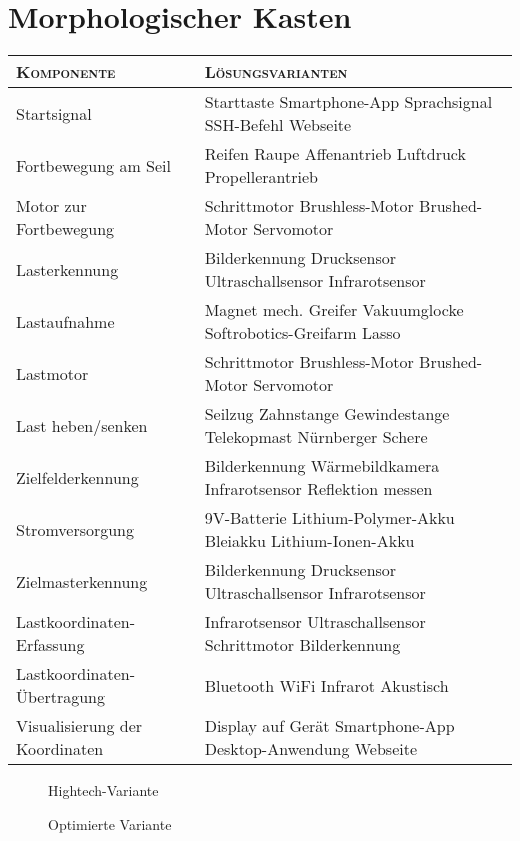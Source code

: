 \documentclass[a4paper,12pt,landscape]{scrartcl}
\newcommand{\rc}{\textcolor{red}{\large{\checkmark}}}
\newcommand{\gc}{\textcolor{green}{\large{\checkmark}}}
\begin{document}
\section{Morphologischer Kasten}

\def\arraystretch{1.8}
\begin{tabularx}{\textwidth}{|l|X|}
\hline
\large{\textsc{Komponente}} & \large{\textsc{Lösungsvarianten}} \\
\hline
Startsignal & Starttaste \hfill \gc Smartphone-App \hfill \rc Sprachsignal \hfill SSH-Befehl \hfill Webseite \\
Fortbewegung am Seil & \gc Reifen \hfill Raupe \hfill \rc Affenantrieb \hfill Luftdruck \hfill Propellerantrieb \\
Motor zur Fortbewegung & \rc \gc Schrittmotor \hfill Brushless-Motor \hfill Brushed-Motor \hfill Servomotor \\
Lasterkennung & \rc \gc Bilderkennung \hfill Drucksensor \hfill Ultraschallsensor \hfill Infrarotsensor \\
Lastaufnahme & Magnet \hfill mech. Greifer \hfill Vakuumglocke \hfill \rc \gc Softrobotics-Greifarm \hfill Lasso \\
Lastmotor & \rc \gc Schrittmotor \hfill Brushless-Motor \hfill Brushed-Motor \hfill Servomotor \\
Last heben/senken & \gc Seilzug \hfill Zahnstange \hfill Gewindestange \hfill \rc Telekopmast \hfill Nürnberger Schere \\
Zielfelderkennung & \gc Bilderkennung \hfill \rc Wärmebildkamera \hfill Infrarotsensor \hfill Reflektion messen \\
Stromversorgung & 9V-Batterie \hfill \gc Lithium-Polymer-Akku \hfill Bleiakku \hfill \rc Lithium-Ionen-Akku \\
Zielmasterkennung & \rc Bilderkennung \hfill \gc Drucksensor \hfill Ultraschallsensor \hfill Infrarotsensor \\
Lastkoordinaten-Erfassung & Infrarotsensor \hfill \gc Ultraschallsensor \hfill Schrittmotor \hfill \rc Bilderkennung \\
Lastkoordinaten-Übertragung & Bluetooth \hfill \gc WiFi \hfill Infrarot \hfill \rc Akustisch \\
Visualisierung der Koordinaten & Display auf Gerät \hfill \gc Smartphone-App \hfill \rc Desktop-Anwendung \hfill Webseite \\
\hline
\end{tabularx}

\begin{description}
    \item [\rc] Hightech-Variante
    \item [\gc] Optimierte Variante
\end{description}
\end{document}
